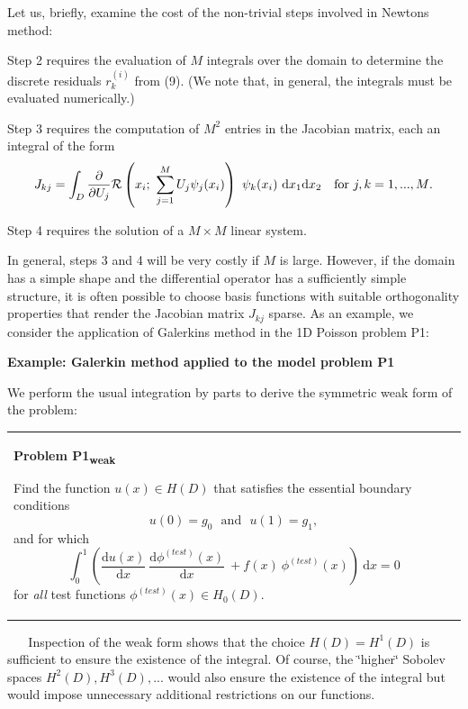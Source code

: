 Let us, briefly, examine the cost of the non-\/trivial steps involved in Newton\textquotesingle{}s method\+:
\begin{DoxyItemize}
\item Step 2 requires the evaluation of $M$ integrals over the domain to determine the discrete residuals $ r_k^{(i)} $ from (9). (We note that, in general, the integrals must be evaluated numerically.)
\item Step 3 requires the computation of $M^2$ entries in the Jacobian matrix, each an integral of the form \[ J_{kj} = \int_{D} \frac{\partial }{\partial U_j} {\cal R}\left(x_i; \ \sum_{j=1}^{M} U_j \psi_j(x_i)\right) \ \psi_k(x_i) \ \mbox{d}x_1 \mbox{d}x_2 \mbox{\ \ \ for $j,k=1,...,M$.} \]
\item Step 4 requires the solution of a $M \times M$ linear system.
\end{DoxyItemize}In general, steps 3 and 4 will be very costly if $M$ is large. However, if the domain has a simple shape and the differential operator has a sufficiently simple structure, it is often possible to choose basis functions with suitable orthogonality properties that render the Jacobian matrix $J_{kj}$ sparse. As an example, we consider the application of Galerkin\textquotesingle{}s method in the 1D Poisson problem P1\+:

\begin{center} {\bfseries  Example\+: Galerkin method applied to the model problem P1 }\end{center}  We perform the usual integration by parts to derive the symmetric weak form of the problem\+: ~\newline
 ~\newline
\begin{center} \tabulinesep=1mm
\begin{longtabu} spread 0pt [c]{*{1}{|X[-1]}|}
\hline
\begin{center} {\bfseries  Problem P1\textsubscript{weak} }\end{center}  \begin{center} Find the function $ u(x) \in H(D) $ that satisfies the essential boundary conditions \[ u(0) = g_0 \ \ \ \mbox{and} \ \ \ u(1) = g_1, \] and for which \[ \int_0^1 \left( \frac{\mbox{d} u(x)}{\mbox{d} x} \ \frac{\mbox{d} \phi^{(test)}(x)}{\mbox{d} x} \ + f(x) \ \phi^{(test)}(x) \right)\ \mbox{d}x = 0 \] for {\itshape all} test functions $ \phi^{(test)}(x) \in H_0(D). $ \end{center}    \\
\end{longtabu}
\end{center}  ~\newline
~\newline
Inspection of the weak form shows that the choice $H(D) = H^1(D) $ is sufficient to ensure the existence of the integral. Of course, the \char`\"{}higher\char`\"{} Sobolev spaces $ H^2(D), H^3(D), ... $ would also ensure the existence of the integral but would impose unnecessary additional restrictions on our functions.

